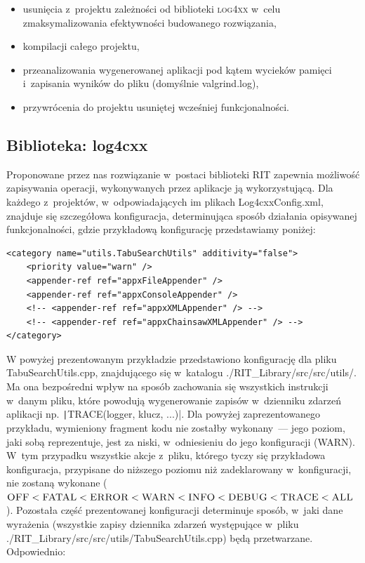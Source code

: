 \begin{itemize}
	\item usunięcia z~projektu zależności od biblioteki \textsc{log4xx} w~celu zmaksymalizowania efektywności budowanego rozwiązania,
	\item kompilacji całego projektu,
	\item przeanalizowania wygenerowanej aplikacji pod kątem wycieków pamięci i~zapisania wyników do pliku (domyślnie \textsf{valgrind.log}),
	\item przywrócenia do projektu usuniętej wcześniej funkcjonalności.
\end{itemize}



\subsection{Biblioteka: log4cxx}



Proponowane przez nas rozwiązanie w~postaci biblioteki \textsc{RIT} zapewnia możliwość zapisywania operacji, wykonywanych przez aplikacje ją wykorzystującą.
Dla każdego z~projektów, w~odpowiadających im plikach \textsf{Log4cxxConfig.xml}, znajduje się szczegółowa konfiguracja, determinująca sposób działania opisywanej funkcjonalności, gdzie przykładową konfigurację przedstawiamy poniżej:

\begin{verbatim}
<category name="utils.TabuSearchUtils" additivity="false">
	<priority value="warn" />
	<appender-ref ref="appxFileAppender" />
	<appender-ref ref="appxConsoleAppender" />
	<!-- <appender-ref ref="appxXMLAppender" /> -->
	<!-- <appender-ref ref="appxChainsawXMLAppender" /> -->
</category>
\end{verbatim}

W powyżej prezentowanym przykładzie przedstawiono konfigurację dla pliku \textsf{TabuSearchUtils.cpp}, znajdującego się w~katalogu \textsf{./RIT\_Library/src/src/utils/}.
Ma ona bezpośredni wpływ na sposób zachowania się wszystkich instrukcji w~danym pliku, które powodują wygenerowanie zapisów w~dzienniku zdarzeń aplikacji np. \texttt|TRACE(logger, klucz, ...)|.
Dla powyżej zaprezentowanego przykładu, wymieniony fragment kodu nie zostałby wykonany~--- jego poziom, jaki sobą reprezentuje, jest za niski, w~odniesieniu do jego konfiguracji (\textsc{WARN}).
W~tym przypadku wszystkie akcje z~pliku, którego tyczy się przykładowa konfiguracja, przypisane do niższego poziomu niż zadeklarowany w~konfiguracji, nie zostaną wykonane ($\textsc{OFF} < \textsc{FATAL} < \textsc{ERROR} < \textsc{WARN} < \textsc{INFO} < \textsc{DEBUG} < \textsc{TRACE} < \textsc{ALL}$).
Pozostała część prezentowanej konfiguracji determinuje sposób, w~jaki dane wyrażenia (wszystkie zapisy dziennika zdarzeń występujące w~pliku \textsf{./RIT\_Library/src/src/utils/TabuSearchUtils.cpp}) będą przetwarzane.
Odpowiednio:

